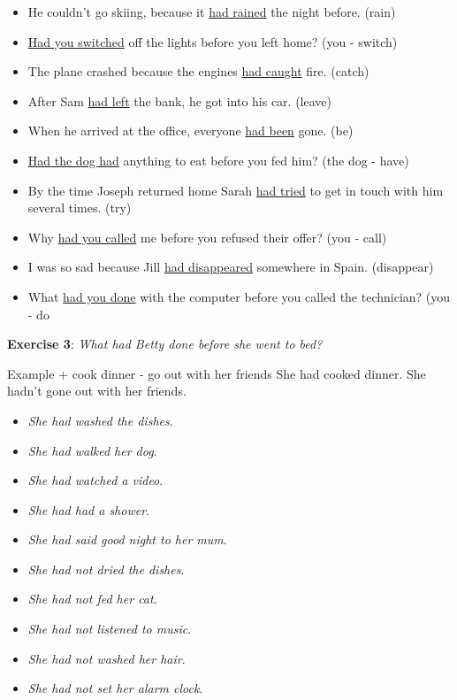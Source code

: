 \begin{itemize}

\item He couldn't go skiing, because it \underline{had rained} the night before. (rain)
\item \underline{Had you switched} off the lights before you left home? (you - switch)
\item The plane crashed because the engines \underline{had caught} fire. (catch)
\item After Sam \underline{had left} the bank, he got into his car. (leave)
\item When he arrived at the office, everyone \underline{had been} gone. (be)
\item \underline{Had the dog had} anything to eat before you fed him? (the dog - have)
\item By the time Joseph returned home Sarah \underline{had tried} to get in touch with him several times. (try)
\item Why \underline{had you called} me before you refused their offer? (you - call)
\item I was so sad because Jill \underline{had disappeared} somewhere in Spain. (disappear)
\item What \underline{had you done} with the computer before you called the technician? (you - do 

\end{itemize}

\textbf{Exercise 3}: \textit{What had Betty done before she went to bed?}

Example
+ cook dinner
- go out with her friends
She had cooked dinner.
She hadn't gone out with her friends.

\begin{itemize}

\item \textit{She had washed the dishes}.
\item \textit{She had walked her dog}.
\item \textit{She had watched a video}.
\item \textit{She had had a shower}.
\item \textit{She had said good night to her mum}.

\item \textit{She had not dried the dishes}.
\item \textit{She had not fed her cat}.
\item \textit{She had not listened to music}.
\item \textit{She had not washed her hair}.
\item \textit{She had not set her alarm clock}.

\end{itemize}

